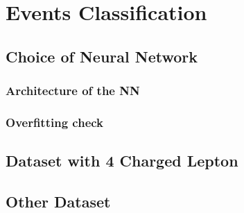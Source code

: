 \chapter{Events Classification}
\label{ch:classification}
\section{Choice of Neural Network}
\subsection{Architecture of the NN}
\subsection{Overfitting check}
\section{Dataset with 4 Charged Lepton}
\section{Other Dataset}